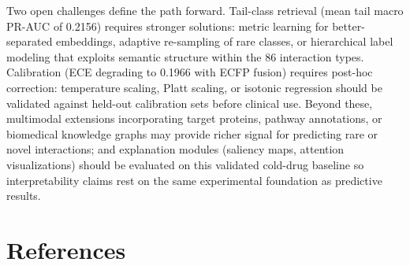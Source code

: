 \documentclass[11pt,a4paper]{report}
\begin{document}
Two open challenges define the path forward. Tail-class retrieval (mean tail macro PR-AUC of 0.2156) requires stronger solutions: metric learning for better-separated embeddings, adaptive re-sampling of rare classes, or hierarchical label modeling that exploits semantic structure within the 86 interaction types. Calibration (ECE degrading to 0.1966 with ECFP fusion) requires post-hoc correction: temperature scaling, Platt scaling, or isotonic regression should be validated against held-out calibration sets before clinical use. Beyond these, multimodal extensions incorporating target proteins, pathway annotations, or biomedical knowledge graphs may provide richer signal for predicting rare or novel interactions; and explanation modules (saliency maps, attention visualizations) should be evaluated on this validated cold-drug baseline so interpretability claims rest on the same experimental foundation as predictive results.

\chapter*{References}
\end{document}
